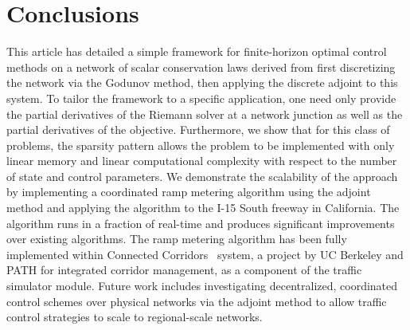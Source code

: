 \section{Conclusions\label{sec:Conclusions}}

This article has detailed a simple framework for finite-horizon optimal control 
methods on a network of scalar conservation laws derived from first 
discretizing the network via the Godunov method, then applying the discrete 
adjoint to this system. To tailor the framework to a specific application, one 
need only provide the partial derivatives of the Riemann solver at a network 
junction as well as the partial derivatives of the objective. Furthermore, we 
show that for this class of problems, the sparsity pattern allows the problem 
to be implemented with only linear memory and linear computational complexity 
with respect to the number of state and control parameters. We demonstrate the 
scalability of the approach by implementing a coordinated ramp metering 
algorithm using the adjoint method and applying the algorithm to the I-15 South freeway in California. The algorithm runs in a fraction of real-time 
and produces significant improvements over existing algorithms. The ramp metering algorithm has been fully implemented within Connected Corridors~\cite{CC} system, a project by UC Berkeley and PATH for integrated corridor management, as a component of the traffic simulator module. Future work 
includes investigating decentralized, coordinated control schemes over physical 
networks via the adjoint method to allow traffic control strategies to scale to 
regional-scale networks.
